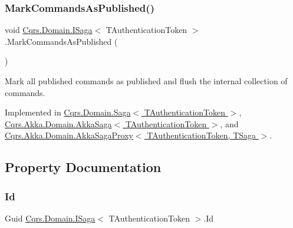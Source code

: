 \mbox{\label{interfaceCqrs_1_1Domain_1_1ISaga_a4ce7c6cb939b5d6a5afb7538da3d1680_a4ce7c6cb939b5d6a5afb7538da3d1680}} 
\subsubsection{\texorpdfstring{Mark\+Commands\+As\+Published()}{MarkCommandsAsPublished()}}
{\footnotesize\ttfamily void \hyperlink{interfaceCqrs_1_1Domain_1_1ISaga}{Cqrs.\+Domain.\+I\+Saga}$<$ T\+Authentication\+Token $>$.Mark\+Commands\+As\+Published (\begin{DoxyParamCaption}{ }\end{DoxyParamCaption})}



Mark all published commands as published and flush the internal collection of commands. 



Implemented in \hyperlink{classCqrs_1_1Domain_1_1Saga_ac0488c612d08f1bcd204e87968f3ab8a_ac0488c612d08f1bcd204e87968f3ab8a}{Cqrs.\+Domain.\+Saga$<$ T\+Authentication\+Token $>$}, \hyperlink{classCqrs_1_1Akka_1_1Domain_1_1AkkaSaga_a8ba652a3fbc2025b3367ef73185f8a6f_a8ba652a3fbc2025b3367ef73185f8a6f}{Cqrs.\+Akka.\+Domain.\+Akka\+Saga$<$ T\+Authentication\+Token $>$}, and \hyperlink{classCqrs_1_1Akka_1_1Domain_1_1AkkaSagaProxy_aec2b133ce13d4bcda56de80f9637330a_aec2b133ce13d4bcda56de80f9637330a}{Cqrs.\+Akka.\+Domain.\+Akka\+Saga\+Proxy$<$ T\+Authentication\+Token, T\+Saga $>$}.



\subsection{Property Documentation}
\mbox{\label{interfaceCqrs_1_1Domain_1_1ISaga_aa470a39d3bcdc506dbd5bf49d127bc3c_aa470a39d3bcdc506dbd5bf49d127bc3c}} 
\subsubsection{\texorpdfstring{Id}{Id}}
{\footnotesize\ttfamily Guid \hyperlink{interfaceCqrs_1_1Domain_1_1ISaga}{Cqrs.\+Domain.\+I\+Saga}$<$ T\+Authentication\+Token $>$.Id\hspace{0.3cm}{\ttfamily [get]}}




